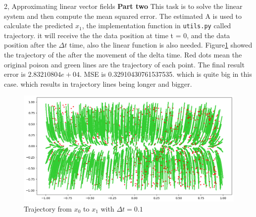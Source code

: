 \begin{task}{2, Approximating linear vector fields}
\textbf{Part two}
This task is to solve the linear system and then compute the mean squared error. The estimated A is used to calculate the predicted $x_1$, the implementation function in \verb|utils.py| called trajectory. it will receive the the data position at time t = 0, and the data position after the $\Delta t$ time, also the linear function is also needed. Figure\ref{fig:2.2} showed the trajectory of the after the movement of the delta time. Red dots mean the original poison and green lines are the trajectory of each point. The final result error is $2.83210804e+04$. MSE is 0.32910430761537535. which is quite big in this case. which results in trajectory lines being longer and bigger. 
\begin{figure}[H]
\centering
\includegraphics[width=1\textwidth]{images/task2_2.png}
\caption{Trajectory from $x_0$ to $x_1$ with $\Delta t = 0.1$}
\label{fig:2.2}
\end{figure}


\end{task}
